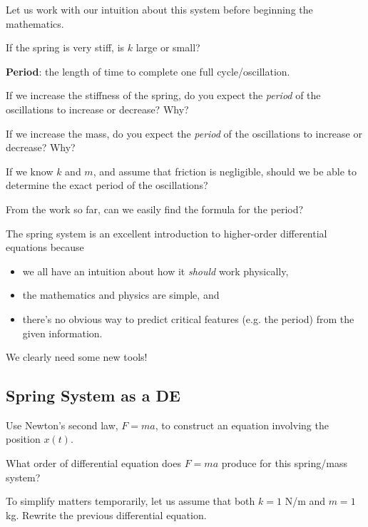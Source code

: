 \newpage
Let us work with our intuition about this system before beginning the mathematics.

If the spring is very stiff, is $k$ large or small?
\vfill

\newpage
{\bf Period}: the length of time to complete one full cycle/oscillation.
\vspace{0.2in}

If we increase the stiffness of the spring, do you expect the {\em period} 
of the oscillations to increase or decrease?  Why?

\vfill

If we increase the mass, do you expect
the \emph{period} of the oscillations to increase or decrease? Why?

\vfill

\newpage

If we know $k$ and $m$, and assume that friction is negligible, should
we be able to determine the exact period of the oscillations?  \vfill


\vfill

From the work so far, can we easily find the formula for the period?

\vfill

\newpage

The spring system is an excellent introduction to higher-order differential equations because 
\begin{itemize}
\item we all have an intuition about how it \emph{should} work physically,
\item the mathematics and physics are simple, and
\item there's no obvious way to predict critical features (e.g. the
  period) from the given information.
\end{itemize}
We clearly need some new tools!

\newpage
{}
\subsection*{Spring System as a DE}

Use Newton's second law, $F = ma$, to construct an equation involving
the position $x(t)$.  \vfill

What order of differential equation does $F=ma$ produce for this
spring/mass system?

\vfill

\newpage

To simplify matters temporarily, let us assume that both
  $k = 1 $ N/m and $m = 1$ kg. Rewrite the previous differential
  equation.
\vfill

